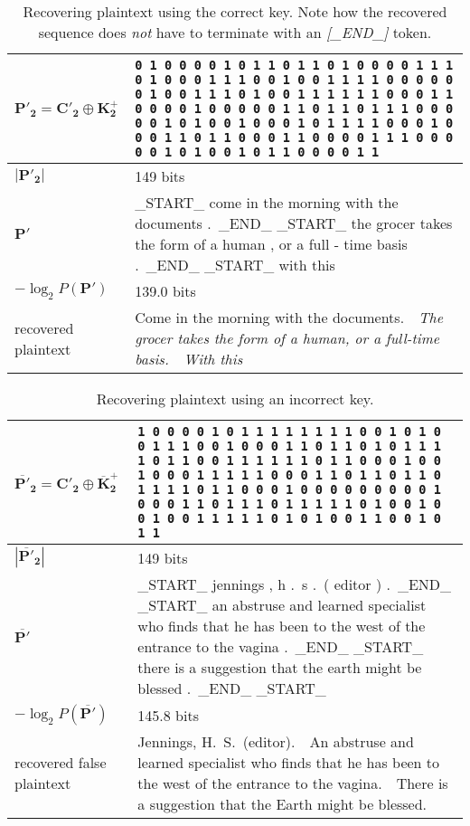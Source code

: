 \documentclass[draft]{IIBproject}
\DeclareRobustCommand{\ngram}[1]{\emph{[#1]}}
\begin{document}
\begin{table}[h]
	\centering
	\begin{tabular}{m{3cm} m{12cm}}
	\centering $\mathbf{P'_2} = \mathbf{C'_2} \oplus \mathbf{K^+_2}$ & \footnotesize \texttt{0 1 0 0 0 0 1 0 1 1 0 1 1 0 1 0 0 0 0 1 1 1 0 1 0 0 0 1 1 1 0 0 1 0 0 1 1 1 1 0 0 0 0 0 0 1 0 0 1 1 1 0 1 0 0 1 1 1 1 1 1 0 0 0 1 1 0 0 0 0 1 0 0 0 0 0 1 1 0 1 1 0 1 1 1 0 0 0 0 0 1 0 1 0 0 1 0 0 0 1 0 1 1 1 1 0 0 0 1 0 0 0 1 1 0 1 1 0 0 0 1 1 0 0 0 0 1 1 1 0 0 0 0 0 1 0 1 0 0 1 0 1 1 0 0 0 0 1 1} \\ \hline
	\centering $| \mathbf{P'_2} |$ & 149 bits \\ \hline
	\centering $\mathbf{P'}$ & \_START\_ come in the morning with the documents .\ \_END\_ \_START\_ the grocer takes the form of a human , or a full - time basis .\ \_END\_ \_START\_ with this \\ \hline
	\centering $-\log_2 P(\mathbf{P'})$ & 139.0 bits \\ \hline
	\centering recovered plaintext & Come in the morning with the documents.\ \ \emph{The grocer takes the form of a human, or a full-time basis.\ \ With this}
	\end{tabular}
	\caption{\label{tab:results_correct_recovered_plaintext}Recovering plaintext using the correct key. Note how the recovered sequence does \emph{not} have to terminate with an \ngram{\_END\_} token.}
\end{table}

\begin{table}[h]
	\centering
	\begin{tabular}{m{3cm} m{12cm}}
	\centering $\mathbf{\overline{P'}_2} = \mathbf{C'_2} \oplus \mathbf{\overline K^+_2}$ & \footnotesize \texttt{1 0 0 0 0 1 0 1 1 1 1 1 1 1 1 0 0 1 0 1 0 0 1 1 1 0 0 1 0 0 0 1 1 0 1 1 0 1 0 1 1 1 1 0 1 1 0 0 1 1 1 1 1 1 0 1 1 0 0 0 1 0 0 1 0 0 0 1 1 1 1 1 0 0 0 1 1 0 1 1 0 1 1 0 1 1 1 1 0 1 1 0 0 0 1 0 0 0 0 0 0 0 0 0 1 0 0 0 1 1 0 1 1 1 0 1 1 1 1 1 0 1 0 0 1 0 0 1 0 0 1 1 1 1 1 0 1 0 1 0 0 1 1 0 0 1 0 1 1} \\ \hline
	\centering $| \mathbf{\overline{P'}_2} |$ & 149 bits \\ \hline
	\centering $\mathbf{\overline{P'}}$ & \_START\_ jennings , h .\ s .\ ( editor ) .\ \_END\_ \_START\_ an abstruse and learned specialist who finds that he has been to the west of the entrance to the vagina .\ \_END\_ \_START\_ there is a suggestion that the earth might be blessed .\ \_END\_ \_START\_ \\ \hline
	\centering $-\log_2 P(\mathbf{\overline{P'}})$ & 145.8 bits \\ \hline
	\centering recovered false plaintext & Jennings, H.\ S.\ (editor).\ \ An abstruse and learned specialist who finds that he has been to the west of the entrance to the vagina.\ \ There is a suggestion that the Earth might be blessed.
	\end{tabular}
	\caption{\label{tab:results_false_recovered_plaintext}Recovering plaintext using an incorrect key.}
\end{table}
\end{document}
